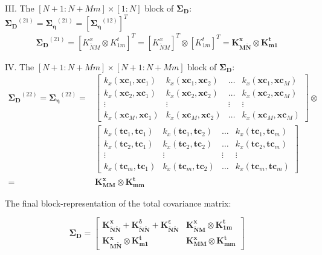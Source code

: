 \documentclass[a4paper,12pt]{article}
\newcommand{\bmxc}{\bm{xc}}
\newcommand{\bmtc}{\bm{tc}}
\begin{document}
III. The $[N+1 : N + Mm]\times [1:N]$ block of $\bm{\Sigma_D}$: $\bm{\Sigma_D}^{(21)} = \bm{\Sigma_{\eta}}^{(21)} =  [\bm{\Sigma_{\eta}}^{(12)}]^T$ 
\begin{align*}
\bm{\Sigma_D}^{(21)} = [K^{x}_{\tilde{N}M} \otimes K^t_{1m}]^T = [K^{x}_{\tilde{N}M}]^T \otimes [K^t_{1m}]^T = \bm{K^{x}_{M\tilde{N}} \otimes K^t_{m1}}
\end{align*}


IV. The $[N+1 : N + Mm]\times [N+1 : N + Mm]$ block of $\bm{\Sigma_D}$: 
\begin{align*}
\bm{\Sigma_D}^{(22)} =\bm{\Sigma_{\eta}}^{(22)} = & \left[
\begin{matrix}
k_x(\bmxc_1, \bmxc_1) & k_x(\bmxc_1, \bmxc_2) & \ldots & k_x(\bmxc_1, \bmxc_M)\\
k_x(\bmxc_2, \bmxc_1) & k_x(\bmxc_2, \bmxc_2) & \ldots & k_x(\bmxc_2, \bmxc_M)\\
\vdots & \vdots & \vdots & \vdots \\
k_x(\bmxc_M, \bmxc_1) & k_x(\bmxc_M, \bmxc_2) & \ldots & k_x(\bmxc_M, \bmxc_M)
\end{matrix}
\right]
\otimes \\ &\left[
\begin{matrix}
k_x(\bmtc_1, \bmtc_1) & k_x(\bmtc_1, \bmtc_2) & \ldots & k_x(\bmtc_1, \bmtc_m)\\
k_x(\bmtc_2, \bmtc_1) & k_x(\bmtc_2, \bmtc_2) & \ldots & k_x(\bmtc_2, \bmtc_m)\\
\vdots & \vdots & \vdots & \vdots \\
k_x(\bmtc_m, \bmtc_1) & k_x(\bmtc_m, \bmtc_2) & \ldots & k_x(\bmtc_m, \bmtc_m)
\end{matrix}
\right] \\
= & \bm{K^{x}_{MM} \otimes K^t_{mm}}
\end{align*}

The final block-representation of the total covariance matrix:

\begin{equation}
\bm{\Sigma_D} = \left[
\begin{matrix}
\bm{K^{x}_{\tilde{N}\tilde{N}}} + \bm{K^{\delta}_{\tilde{N}\tilde{N}}} + \bm{K^{\varepsilon}_{\tilde{N}\tilde{N}}} & \bm{K^{x}_{\tilde{N}M} \otimes K^t_{1m}} \\[5pt]
\bm{K^{x}_{M\tilde{N}} \otimes K^t_{m1}} & \bm{K^{x}_{MM} \otimes K^t_{mm}}
\end{matrix}
\right]
\end{equation}

\newpage
\end{document}

